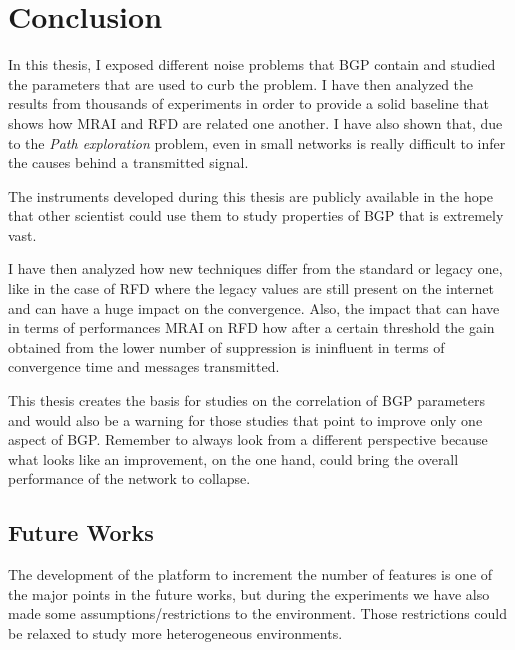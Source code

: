 \chapter{Conclusion}
\label{cha:conclusion}

In this thesis, I exposed different noise problems that \ac{BGP} contain and
studied the parameters that are used to curb the problem.
I have then analyzed the results from thousands of experiments in order to 
provide a solid baseline that shows how \ac{MRAI} and \ac{RFD} are related
one another.
I have also shown that, due to the \textit{Path exploration} problem, even 
in small networks is really difficult to infer the causes behind a transmitted
signal.

The instruments developed during this thesis are publicly available in the
hope that other scientist could use them to study properties of \ac{BGP} that
is extremely vast.

I have then analyzed how new techniques differ from the standard or legacy one,
like in the case of \ac{RFD} where the legacy values are still present on the
internet and can have a huge impact on the convergence.
Also, the impact that can have in terms of performances \ac{MRAI} on \ac{RFD}
how after a certain threshold the gain obtained from the lower number of 
suppression is ininfluent in terms of convergence time and messages transmitted.

This thesis creates the basis for studies on the correlation of \ac{BGP} parameters
and would also be a warning for those studies that point to improve only 
one aspect of \ac{BGP}.
Remember to always look from a different perspective because what looks like an
improvement, on the one hand, could bring the overall performance of the 
network to collapse.


\section{Future Works}
\label{sec:future_works}

The development of the platform to increment the number of features is one of 
the major points in the future works, but during the experiments we have also
made some assumptions/restrictions to the environment.
Those restrictions could be relaxed to study more heterogeneous environments.

